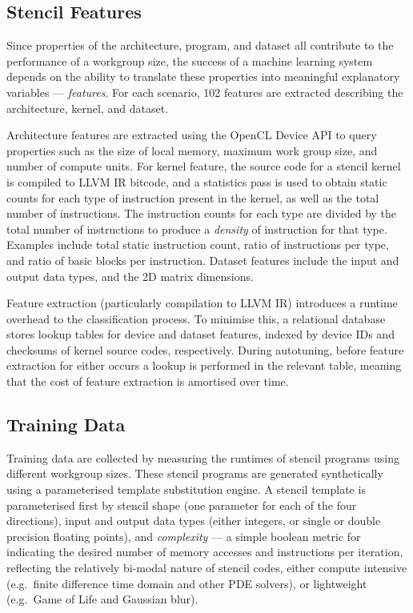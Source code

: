 \documentclass[nonatbib,preprint,10pt]{sigplanconf}
\begin{document}
\subsection{Stencil Features}

Since properties of the architecture, program, and dataset all
contribute to the performance of a workgroup size, the success of a
machine learning system depends on the ability to translate these
properties into meaningful explanatory variables ---
\emph{features}. For each scenario, 102 features are extracted
describing the architecture, kernel, and dataset.

Architecture features are extracted using the OpenCL Device API to
query properties such as the size of local memory, maximum work group
size, and number of compute units. For kernel feature, the source code
for a stencil kernel is compiled to LLVM IR bitcode, and a statistics
pass is used to obtain static counts for each type of instruction
present in the kernel, as well as the total number of
instructions. The instruction counts for each type are divided by the
total number of instructions to produce a \emph{density} of
instruction for that type. Examples include total static instruction
count, ratio of instructions per type, and ratio of basic blocks per
instruction. Dataset features include the input and output data types,
and the 2D matrix dimensions.

Feature extraction (particularly compilation to LLVM IR) introduces a
runtime overhead to the classification process. To minimise this, a
relational database stores lookup tables for device and dataset
features, indexed by device IDs and checksums of kernel source codes,
respectively. During autotuning, before feature extraction for either
occurs a lookup is performed in the relevant table, meaning that the
cost of feature extraction is amortised over time.


\subsection{Training Data}\label{subsec:training}

Training data are collected by measuring the runtimes of stencil
programs using different workgroup sizes. These stencil programs are
generated synthetically using a parameterised template substitution
engine. A stencil template is parameterised first by stencil shape
(one parameter for each of the four directions), input and output data
types (either integers, or single or double precision floating
points), and \emph{complexity} --- a simple boolean metric for
indicating the desired number of memory accesses and instructions per
iteration, reflecting the relatively bi-modal nature of stencil codes,
either compute intensive (e.g.\ finite difference time domain and
other PDE solvers), or lightweight (e.g.\ Game of Life and Gaussian
blur).
\end{document}
